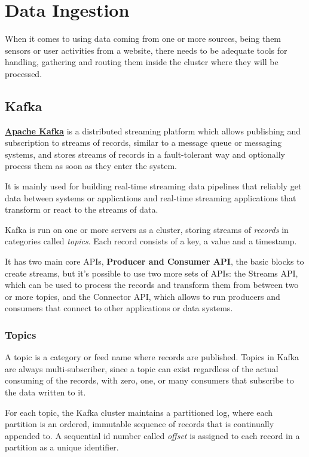 \chapter{Data Ingestion}

When it comes to using data coming from one or more sources, being them sensors or user activities from a website, there needs to be adequate tools for handling, gathering and routing them inside the cluster where they will be processed.

\section{Kafka}

\textbf{\href{https://kafka.apache.org}{Apache Kafka}} \cite{kafka_doc} is a distributed streaming platform which allows publishing and subscription to streams of records, similar to a message queue or messaging systems, and stores streams of records in a fault-tolerant way and optionally process them as soon as they enter the system. 

It is mainly used for building real-time streaming data pipelines that reliably get data between systems or applications and real-time streaming applications that transform or react to the streams of data.

Kafka is run on one or more servers as a cluster, storing streams of \textit{records} in categories called \textit{topics}. Each record consists of a key, a value and a timestamp.

It has two main core APIs, \textbf{Producer and Consumer API}, the basic blocks to create streams, but it's possible to use two more sets of APIs: the Streams API, which can be used to process the records and transform them from between two or more topics, and the Connector API, which allows to run producers and consumers that connect to other applications or data systems.

\subsection{Topics}

A topic is a category or feed name where records are published. Topics in Kafka are always multi-subscriber, since a topic can exist regardless of the actual consuming of the records, with zero, one, or many consumers that subscribe to the data written to it.

For each topic, the Kafka cluster maintains a partitioned log, where each partition is an ordered, immutable sequence of records that is continually appended to. A sequential id number called \textit{offset} is assigned to each record in a partition as a unique identifier.

